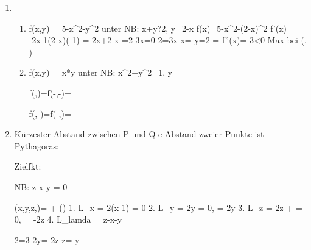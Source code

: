 \begin{enumerate}

\item %

\begin{enumerate}

\item %

f(x,y) = 5-x^2-y^2	unter NB: x+y?2, y=2-x
\Rightarrow
f(x)=5-x^2-(2-x)^2
f'(x) = -2x-1(2-x)(-1)
=-2x+2-x
=2-3x=0
2=3x
x=
y=2-=
f''(x)=-3<0 \Rightarrow Max bei (, )

\item %

f(x,y) = x*y	unter NB: x^2+y^2=1, y=\pm {}

\begin{comment}
1. Nebenbed. nach 0 umstellen: x^2+y^2-1=0
2. Lagrange-Funktion: \mathcal{L}(x,y,z)=\underbrace{x*y}{f(x,y)} + \lamda(\underbrace{x^2+y^2-1}{NB})
3.
3.1 \mathcal{L}_x(x,y,z) = y+2 \lamda x = 0
\lamda = -\frac{y}{2x}
3.2 \mathcal{L}_y(x,y,z) = x + 2 \lamda y = 0
\lamda = -\frac{x}{2y}
3.3 \mathcal{L}_{\lamda}(x,y,z) = x^2 + y^2 -1 = 0
4.
3.1=3.2
\frac{y}{2x} = \frac{x}{2y}
2x^2=2y^2
x^2=y^2
y=\sqrt{x^2}=\pm x
5.
4. in 3.3
x^2 + x^2 -1 = 0
2y^2 = 1
y=\pm \sqrt{\frac{1}{2}}
x_1=+\sqrt{\frac{1}{2}}
x_2=-\sqrt{\frac{1}{2}}
\end{comment}

f(,)=f(-,-)=

f(,-)=f(-,)=-

\end{enumerate}


\item %

Kürzester Abstand zwischen P und Q \in e
\Rightarrow Abstand zweier Punkte ist Pythagoras: 

Zielfkt: 

NB: z-x-y = 0

(x,y,z,\lamda)= + \lamda()
1. L_x = 2(x-1)-\lamda = 0
2. L_y = 2y-\lamda = 0, \lamda = 2y
3. L_z = 2z + \lamda = 0, \lamda = -2z
4. L_{lamda} = z-x-y

2=3
2y=-2z
z=-y


\end{enumerate}
